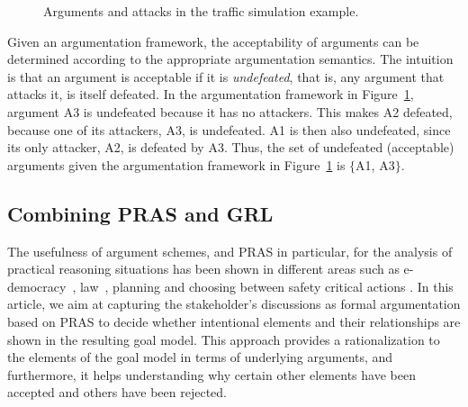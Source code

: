 \begin{figure}[ht!]
\centering
{}
\caption{Arguments and attacks in the traffic simulation example.}
\label{fig:pras:example}
\end{figure}

Given an argumentation framework, the acceptability of arguments can be determined according to the appropriate argumentation semantics. The intuition is that an argument is acceptable if it is \emph{undefeated}, that is, any argument that attacks it, is itself defeated. In the argumentation framework in Figure~\ref{fig:pras:example}, argument A3 is undefeated because it has no attackers. This makes A2 defeated, because one of its attackers, A3, is undefeated. A1 is then also undefeated, since its only attacker, A2, is defeated by A3. Thus, the set of undefeated (acceptable) arguments given the argumentation framework in Figure~\ref{fig:pras:example} is $\{$A1, A3$\}$.


\subsection{Combining PRAS and GRL}
\label{sect:background:pras:motivation}

The usefulness of argument schemes, and PRAS in particular, for the analysis of practical reasoning situations has been shown in different areas such as e-democracy~\cite{cartwright2009IS}, law~\cite{atkinson2005legal}, planning \cite{medellin2013planning} and choosing between safety critical actions \cite{tolchinsky2012deliberation}. In this article, we aim at capturing the stakeholder's discussions as formal argumentation based on PRAS to decide whether intentional elements and their relationships are shown in the resulting goal model. This approach provides a rationalization to the elements of the goal model in terms of underlying arguments, and furthermore, it helps understanding why certain other elements have been accepted and others have been rejected.

